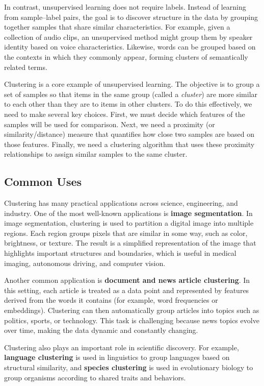 \documentclass{article}
\begin{document}
In contrast, unsupervised learning does not require labels. Instead of learning from sample–label pairs, the goal is to discover structure in the data by grouping together samples that share similar characteristics. For example, given a collection of audio clips, an unsupervised method might group them by speaker identity based on voice characteristics. Likewise, words can be grouped based on the contexts in which they commonly appear, forming clusters of semantically related terms.

Clustering is a core example of unsupervised learning. The objective is to group a set of samples so that items in the same group (called a \textit{cluster}) are more similar to each other than they are to items in other clusters. To do this effectively, we need to make several key choices. First, we must decide which features of the samples will be used for comparison. Next, we need a proximity (or similarity/distance) measure that quantifies how close two samples are based on those features. Finally, we need a clustering algorithm that uses these proximity relationships to assign similar samples to the same cluster.

\subsection{Common Uses}

Clustering has many practical applications across science, engineering, and industry. 
One of the most well-known applications is \textbf{image segmentation}. In image 
segmentation, clustering is used to partition a digital image into multiple regions. 
Each region groups pixels that are similar in some way, such as color, brightness, 
or texture. The result is a simplified representation of the image that highlights 
important structures and boundaries, which is useful in medical imaging, 
autonomous driving, and computer vision.

Another common application is \textbf{document and news article clustering}. 
In this setting, each article is treated as a data point and represented by features 
derived from the words it contains (for example, word frequencies or embeddings). 
Clustering can then automatically group articles into topics such as politics, 
sports, or technology. This task is challenging because news topics evolve over time, 
making the data dynamic and constantly changing.

Clustering also plays an important role in scientific discovery. For example, 
\textbf{language clustering} is used in linguistics to group languages based on 
structural similarity, and \textbf{species clustering} is used in evolutionary 
biology to group organisms according to shared traits and behaviors.
\end{document}
